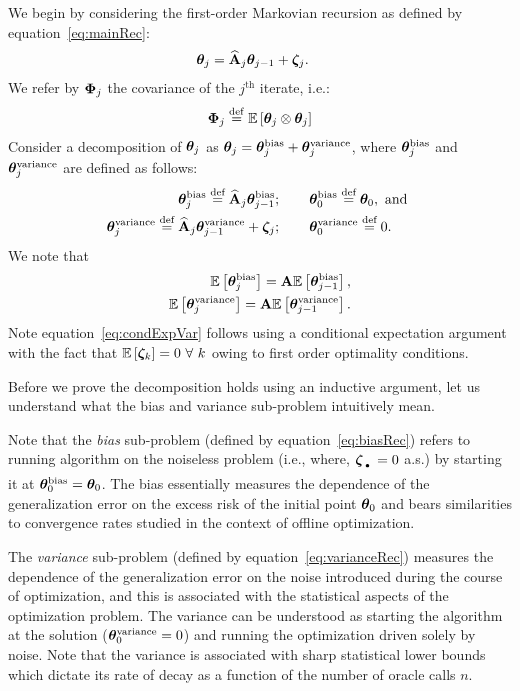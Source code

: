 We begin by considering the first-order Markovian recursion as defined by equation~\ref{eq:mainRec}:
\begin{align*}
\thetav_j&=\Ah_j\thetav_{j-1}+\zetav_j.
\end{align*}
We refer by $\phiv_j$ the covariance of the $j^{\text{th}}$ iterate, i.e.:
\begin{align}
\label{eq:finalIterateCovariance}
\phiv_j \defeq \E{\thetav_j\otimes\thetav_j}
\end{align}
Consider a decomposition of $\thetat$ as $\thetat = \thetat^{\textrm{bias}} + \thetat^{\textrm{variance}}$, where $\thetat^{\textrm{bias}}$ and $\thetat^{\textrm{variance}}$ are defined as follows:
\begin{align}
	\thetat^{\textrm{bias}} \eqdef \Ahatj \thetat[j-1]^{\textrm{bias}} &;\qquad  \thetat[0]^{\textrm{bias}} \eqdef \thetat[0], \mbox{ and } \label{eq:biasRec}\\
	\thetat^{\textrm{variance}} \eqdef \Ahatj \thetat[j-1]^{\textrm{variance}} +\zetat &;\qquad  \thetat[0]^{\textrm{variance}} \eqdef \zero. \label{eq:varianceRec}
\end{align}
We note that 
\begin{align}
\E{\thetav_j^{\textrm{bias}}}=\A\E{\thetav_{j-1}^{\textrm{bias}}}\label{eq:condExpBias},\\
\E{\thetav_j^{\textrm{variance}}}=\A\E{\thetav_{j-1}^{\textrm{variance}}}\label{eq:condExpVar}.
\end{align}
Note equation~\ref{eq:condExpVar} follows using a conditional expectation argument with the fact that $\E{\zetav_k}=0\ \forall\ k$ owing to first order optimality conditions.

Before we prove the decomposition holds using an inductive argument, let us understand what the bias and variance sub-problem intuitively mean. 

Note that the {\em bias} sub-problem (defined by equation~\ref{eq:biasRec}) refers to running algorithm on the noiseless problem (i.e., where, $\zetav_{\Bigcdot}=0$ a.s.) by starting it at $\thetav_0^{\textrm{bias}}=\thetav_0$. The bias essentially measures the dependence of the generalization error on the excess risk of the initial point $\thetav_0$ and bears similarities to convergence rates studied in the context of offline optimization. 

The {\em variance} sub-problem (defined by equation~\ref{eq:varianceRec}) measures the dependence of the generalization error on the noise introduced during the course of optimization, and this is associated with the statistical aspects of the optimization problem. The variance can be understood as starting the algorithm at the solution ($\thetav_0^{\text{variance}}=0$) and running the optimization driven solely by noise. Note that the variance is associated with sharp statistical lower bounds which dictate its rate of decay as a function of the number of oracle calls $n$.

